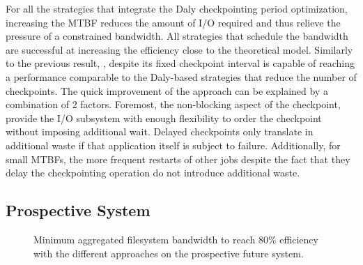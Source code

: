 For all the strategies that integrate the Daly checkpointing period
optimization, increasing the MTBF reduces the amount of I/O required
and thus relieve the pressure of a constrained bandwidth. All
strategies that schedule the bandwidth are successful at increasing the
efficiency close to the theoretical model.
%
Similarly to the previous result, \fifofixed, despite its fixed checkpoint
interval is capable of reaching a performance comparable to the Daly-based
strategies that reduce the number of checkpoints. The quick improvement of the
\fifofixed approach can be explained by a combination of 2 factors. Foremost,
the non-blocking aspect of the checkpoint, provide the I/O subsystem with enough
flexibility to order the checkpoint without imposing additional wait. Delayed
checkpoints only translate in additional waste if that application itself is
subject to failure. Additionally, for small MTBFs, the more frequent restarts of
other jobs despite the fact that they delay the checkpointing operation do not
introduce additional waste.


\subsection{Prospective System}

\begin{figure}
  \begin{center}
    \resizebox{\linewidth}{!}{}
  \end{center}
  \caption{Minimum aggregated filesystem bandwidth to reach 80\%
    efficiency with the different approaches on the prospective
    future system.\label{fig:prosp}}
\end{figure}

